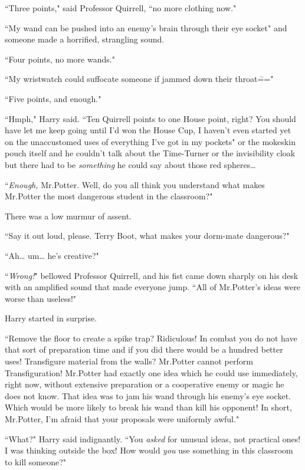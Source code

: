 ``Three points," said Professor Quirrell, ``no more clothing now."

``My wand can be pushed into an enemy's brain through their eye socket" and someone made a horrified, strangling sound.

``Four points, no more wands."

``My wristwatch could suffocate someone if jammed down their throat\==="

``Five points, and enough."

``Hmph," Harry said. ``Ten Quirrell points to one House point, right? You should have let me keep going until I'd won the House Cup, I haven't even started yet on the unaccustomed uses of everything I've got in my pockets" or the mokeskin pouch itself and he couldn't talk about the Time-Turner or the invisibility cloak but there had to be \emph{something} he could say about those red spheres{\ldots}

``\emph{Enough,} Mr.\?Potter. Well, do you all think you understand what makes Mr.\?Potter the most dangerous student in the classroom?"

There was a low murmur of assent.

``Say it out loud, please. Terry Boot, what makes your dorm-mate dangerous?"

``Ah{\ldots} um{\ldots} he's creative?"

``\emph{Wrong!}" bellowed Professor Quirrell, and his fist came down sharply on his desk with an amplified sound that made everyone jump. ``All of Mr.\?Potter's ideas were worse than useless!"

Harry started in surprise.

``Remove the floor to create a spike trap? Ridiculous! In combat you do not have that sort of preparation time and if you did there would be a hundred better uses! Transfigure material from the walls? Mr.\?Potter cannot perform Transfiguration! Mr.\?Potter had exactly one idea which he could use immediately, right now, without extensive preparation or a cooperative enemy or magic he does not know. That idea was to jam his wand through his enemy's eye socket. Which would be more likely to break his wand than kill his opponent! In short, Mr.\?Potter, I'm afraid that your proposals were uniformly awful."

``What?" Harry said indignantly. ``You \emph{asked} for unusual ideas, not practical ones! I was thinking outside the box! How would \emph{you} use something in this classroom to kill someone?"

